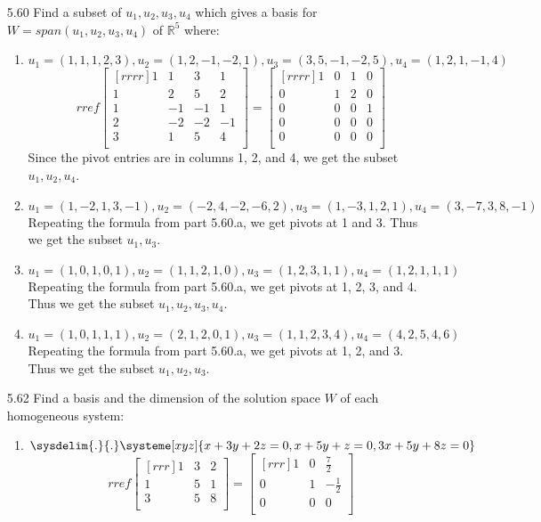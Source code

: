 \documentclass[12pt]{article}
\begin{document}
\begin{enumerate}
\item[5.60] Find a subset of $u_1,u_2,u_3,u_4$ which gives a basis for $W=span(u_1,u_2,u_3,u_4)$ of $\mathbb{R}^5$ where:
	\begin{enumerate}
	\item $u_1=(1,1,1,2,3),u_2=(1,2,-1,-2,1),u_3=(3,5,-1,-2,5),u_4=(1,2,1,-1,4)$
		\[ rref\begin{bmatrix}[rrrr]1&1&3&1\\1&2&5&2\\1&-1&-1&1\\2&-2&-2&-1\\3&1&5&4\\\end{bmatrix} = \begin{bmatrix}[rrrr]1&0&1&0\\0&1&2&0\\0&0&0&1\\0&0&0&0\\0&0&0&0\\\end{bmatrix} \]
		Since the pivot entries are in columns 1, 2, and 4, we get the subset $u_1,u_2,u_4$.
	\item $u_1=(1,-2,1,3,-1),u_2=(-2,4,-2,-6,2),u_3=(1,-3,1,2,1),u_4=(3,-7,3,8,-1)$\\
		Repeating the formula from part 5.60.a, we get pivots at 1 and 3. Thus we get the subset $u_1,u_3$.
	\item $u_1=(1,0,1,0,1),u_2=(1,1,2,1,0),u_3=(1,2,3,1,1),u_4=(1,2,1,1,1)$\\
		Repeating the formula from part 5.60.a, we get pivots at 1, 2, 3, and 4. Thus we get the subset $u_1,u_2,u_3,u_4$.
	\item $u_1=(1,0,1,1,1),u_2=(2,1,2,0,1),u_3=(1,1,2,3,4),u_4=(4,2,5,4,6)$\\
		Repeating the formula from part 5.60.a, we get pivots at 1, 2, and 3. Thus we get the subset $u_1,u_2,u_3$.
	\end{enumerate}
\item[5.62] Find a basis and the dimension of the solution space $W$ of each homogeneous system:
	\begin{enumerate}
	\item $\sysdelim{.}{.}\systeme[xyz]{x+3y+2z=0,x+5y+z=0,3x+5y+8z=0}$\\
		\[ rref\begin{bmatrix}[rrr]1&3&2\\1&5&1\\3&5&8\\\end{bmatrix}=\begin{bmatrix}[rrr]1&0&\frac{7}{2}\\0&1&-\frac{1}{2}\\0&0&0\\\end{bmatrix} \]

\end{enumerate}
\end{enumerate}
\end{document}
